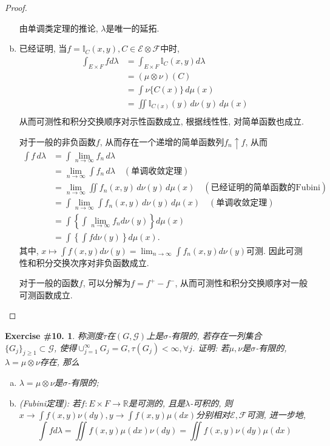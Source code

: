 \documentclass[UTF8, a4paper]{article}
\newtheorem{exercise}{Exercise \#10.}
\begin{document}
\begin{proof}
\begin{enumerate}[a)]
由单调类定理的推论, \(\lambda\)是唯一的延拓.

    \item 已经证明, 当\(f = \mathbb{I}_C(x,y), C\in \mathcal{E} \otimes \mathcal{F}\)中时, $$
    \begin{aligned}
        \int_{E\times F} f d\lambda &= \int_{E\times F} \mathbb{I}_C(x,y) d\lambda \\
        &= (\mu \otimes \nu)(C) \\
        &= \int \nu\{C(x)\} \,d\mu(x) \\
        &= \iint \mathbb{I}_{C(x)}(y) \,d\nu(y) \,d\mu(x) \\
    \end{aligned}
    $$
    从而可测性和积分交换顺序对示性函数成立, 根据线性性, 对简单函数也成立.

    对于一般的非负函数\(f\), 从而存在一个递增的简单函数列\(f_n \uparrow f\), 从而 \begin{align*}
        \int f \, d \lambda &=  \int \lim_{n\to \infty} f_n \, d\lambda \\
        &= \lim_{n\to \infty} \int f_n \, d\lambda \quad (\text{单调收敛定理})\\
        &= \lim_{n\to \infty} \iint f_n(x, y) \,d\nu(y) \,d\mu(x)  \quad (\text{已经证明的简单函数的Fubini})\\
        &= \int \lim_{n\to \infty} \int f_n(x, y) \,d\nu(y) \,d\mu(x)  \quad (\text{单调收敛定理})\\
        &= \int \left\{\int \lim_{n\to \infty} f_n d\nu(y)\right\}d\mu(x) \\
        &= \int \left\{\int f d\nu(y)\right\}d\mu(x).
    \end{align*}
    其中, \(x \mapsto \int f(x, y) d\nu(y) = \lim_{n\to \infty} \int f_n(x, y)d\nu(y)\)可测. 因此可测性和积分交换次序对非负函数成立.

    对于一般的函数\(f\), 可以分解为\(f = f^+ - f^-\), 从而可测性和积分交换顺序对一般可测函数成立.
\end{enumerate}
\end{proof}





\begin{framed}
\begin{exercise}
称测度\(\tau\)在\((G, \mathcal{G})\)上是\(\sigma\)-有限的, 若存在一列集合\(\{G_j\}_{j\geq 1} \subset \mathcal{G}\), 
使得\(\cup_{j=1}^\infty G_j = G, \tau(G_j) < \infty, \forall j\).
证明: 若\(\mu, \nu\)是\(\sigma\)-有限的, \(\lambda = \mu\otimes \nu\)存在, 那么 
\begin{enumerate}[a)]
    \item \(\lambda = \mu\otimes \nu\)是\(\sigma\)-有限的;
    \item (Fubini定理): 若\(f: E\times F \to \mathbb{R}\)是可测的, 且是\(\lambda\)-可积的, 则\(x\to \int f(x,y) \nu(dy), y\to \int f(x,y) \mu(dx)\)分别相对\(\mathcal{E}, \mathcal{F}\)可测, 进一步地, 
$$
\int f d \lambda=\iint f(x, y) \mu(d x) \nu(d y)=\iint f(x, y) \nu(d y) \mu(d x)
$$
\end{enumerate}  
\end{exercise}
\end{framed}
\end{document}
